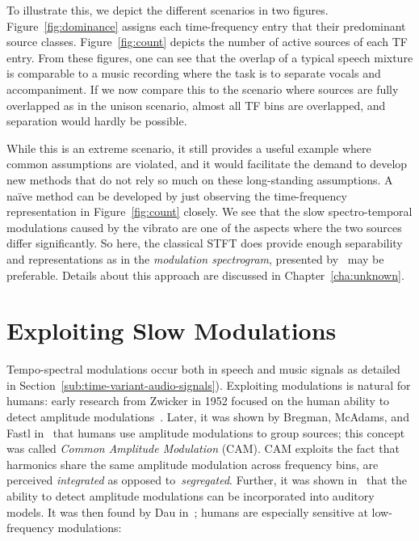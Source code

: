 To illustrate this, we depict the different scenarios in two figures.
Figure~\ref{fig:dominance} assigns each time-frequency entry that their predominant source classes.
Figure~\ref{fig:count} depicts the number of active sources of each TF entry.
From these figures, one can see that the overlap of a typical speech mixture is comparable to a music recording where the task is to separate vocals and accompaniment.
If we now compare this to the scenario where sources are fully overlapped as in the unison scenario, almost all TF bins are overlapped, and separation would hardly be possible.
\par
While this is an extreme scenario, it still provides a useful example where common assumptions are violated, and it would facilitate the demand to develop new methods that do not rely so much on these long-standing assumptions.
A naïve method can be developed by just observing the time-frequency representation in Figure~\ref{fig:count} closely.
We see that the slow spectro-temporal modulations caused by the vibrato are one of the aspects where the two sources differ significantly.
So here, the classical STFT does provide enough separability and representations as in the \emph{modulation spectrogram}, presented by~\cite{greenberg96} may be preferable.
Details about this approach are discussed in Chapter~\ref{cha:unknown}.

\hypertarget{exploiting-slow-modulations}{%
\section{Exploiting Slow Modulations}\label{exploiting-slow-modulations}}

Tempo-spectral modulations occur both in speech and music signals as detailed in Section~\ref{sub:time-variant-audio-signals}).
Exploiting modulations is natural for humans: early research from Zwicker in 1952 focused on the human ability to detect amplitude modulations~\cite{zwicker52}. 
Later, it was shown by Bregman, McAdams, and Fastl in~\cite{mcadams89, bregman90, fastl90} that humans use amplitude modulations to group sources; this concept was called \emph{Common Amplitude Modulation} (CAM).
CAM exploits the fact that harmonics share the same amplitude modulation across frequency bins, are perceived \emph{integrated} as opposed to~\emph{segregated}.
Further, it was shown in~\cite{bacon89} that the ability to detect amplitude modulations can be incorporated into auditory models.
It was then found by Dau in~\cite{dau99}; humans are especially sensitive at low-frequency modulations:

